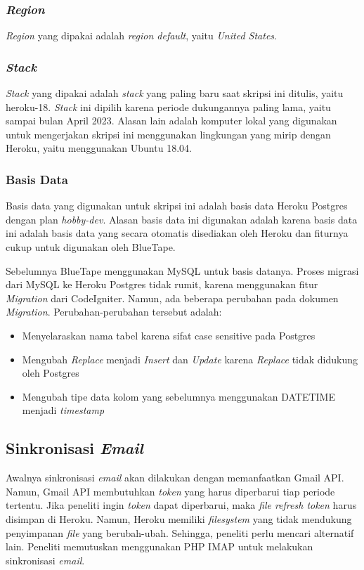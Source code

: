 	\subsubsection{\textit{Region}}
	\textit{Region} yang dipakai adalah \textit{region default}, yaitu \textit{United States}.
		
	\subsubsection{\textit{Stack}}
	\textit{Stack} yang dipakai adalah \textit{stack} yang paling baru saat skripsi ini ditulis, yaitu heroku-18. \textit{Stack} ini dipilih karena periode dukungannya paling lama, yaitu sampai bulan April 2023. Alasan lain adalah komputer lokal yang digunakan untuk mengerjakan skripsi ini menggunakan lingkungan yang mirip dengan Heroku, yaitu menggunakan Ubuntu 18.04.

	\subsubsection{Basis Data}
		Basis data yang digunakan untuk skripsi ini adalah basis data Heroku Postgres dengan plan \textit{hobby-dev}. Alasan basis data ini digunakan adalah karena basis data ini adalah basis data yang secara otomatis disediakan oleh Heroku dan fiturnya cukup untuk digunakan oleh BlueTape.
	
		Sebelumnya BlueTape menggunakan MySQL untuk basis datanya. Proses migrasi dari MySQL ke Heroku Postgres tidak rumit, karena menggunakan fitur \textit{Migration} dari CodeIgniter. Namun, ada beberapa perubahan pada dokumen \textit{Migration}. Perubahan-perubahan tersebut adalah:
	\begin{itemize}
		\item Menyelaraskan nama tabel karena sifat case sensitive pada Postgres
		\item Mengubah \textit{Replace} menjadi \textit{Insert} dan \textit{Update} karena \textit{Replace} tidak didukung oleh Postgres
		\item Mengubah tipe data kolom yang sebelumnya menggunakan DATETIME menjadi \textit{timestamp}
	\end{itemize}  

\subsection{Sinkronisasi \textit{Email}}
\label{sec:analisisemail}
	Awalnya sinkronisasi \textit{email} akan dilakukan dengan memanfaatkan Gmail API. Namun, Gmail API membutuhkan \textit{token} yang harus diperbarui tiap periode tertentu. Jika peneliti ingin \textit{token} dapat diperbarui, maka \textit{file refresh token} harus disimpan di Heroku. Namun, Heroku memiliki \textit{filesystem} yang tidak mendukung penyimpanan \textit{file} yang berubah-ubah. Sehingga, peneliti perlu mencari alternatif lain. Peneliti memutuskan menggunakan PHP IMAP untuk melakukan sinkronisasi \textit{email}.
	
